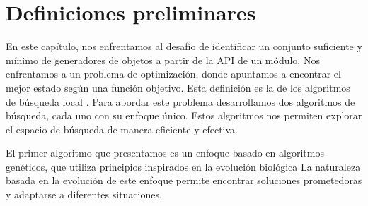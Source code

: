   





\section{Definiciones preliminares}
\label{sec:preliminares}


En este capítulo, nos enfrentamos al desafío de identificar un conjunto suficiente y mínimo de generadores de objetos a partir de la API de un módulo. 
Nos enfrentamos a un problema de optimización, donde apuntamos a encontrar el mejor estado según una función objetivo.
Esta definición es la de los algoritmos de búsqueda local \cite{Russell:2009}.
Para abordar este problema desarrollamos dos algoritmos de búsqueda, cada uno con su enfoque único. Estos algoritmos nos permiten explorar el espacio de búsqueda de manera eficiente y efectiva.

El primer algoritmo que presentamos es un enfoque basado en algoritmos genéticos, que utiliza principios inspirados en la evolución biológica \cite{Goldberg:1989}
La naturaleza basada en la evolución de este enfoque permite encontrar soluciones prometedoras y adaptarse a diferentes situaciones.

